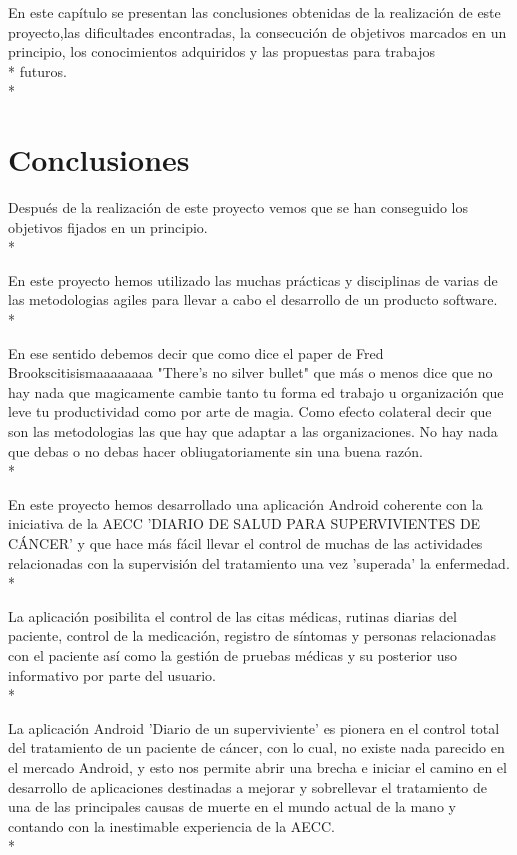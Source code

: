 \documentclass[../pfc.tex]{subfiles}
\begin{document}
	
	En este capítulo se presentan las conclusiones obtenidas de la realización de este proyecto,las dificultades encontradas, la consecución de objetivos marcados en un principio, los conocimientos adquiridos y las propuestas para trabajos\\* futuros.\\*
	
	\section{Conclusiones}
	
	Después de la realización de este proyecto vemos que se han conseguido los objetivos fijados en un principio.\\*
	
	En este proyecto hemos utilizado las muchas prácticas y disciplinas de varias de las metodologias agiles para llevar a cabo el desarrollo de un producto software.\\* 
	
	En ese sentido debemos decir que como dice el paper de Fred Brooks{{citisismaaaaaaaa}} "There's no silver bullet" que más o menos dice que no hay nada que magicamente cambie tanto tu forma ed trabajo u organización que leve tu productividad como por arte de magia. Como efecto colateral decir que son las metodologias las que hay que adaptar a las organizaciones. No hay nada que debas o no debas hacer obliugatoriamente sin una buena razón.\\*
	
	En este proyecto hemos desarrollado una aplicación Android coherente con la iniciativa de la AECC 'DIARIO DE SALUD PARA SUPERVIVIENTES DE CÁNCER' y que hace más fácil llevar el control de muchas de las actividades relacionadas con la supervisión del tratamiento una vez 'superada' la enfermedad.\\*
	
	La aplicación posibilita el control de las citas médicas, rutinas diarias del paciente, control de la medicación, registro de síntomas y personas relacionadas con el paciente así como la gestión de pruebas médicas y su posterior uso informativo por parte del usuario.\\*
	
	La aplicación Android 'Diario de un superviviente' es pionera en el control total del tratamiento de un paciente de cáncer, con lo cual, no existe nada parecido en el mercado Android, y esto nos permite abrir una brecha e iniciar el camino en el desarrollo de aplicaciones destinadas a mejorar y sobrellevar el tratamiento de una de las principales causas de muerte en el mundo actual de la mano y contando con la inestimable experiencia de la AECC.\\*
	
\end{document}
